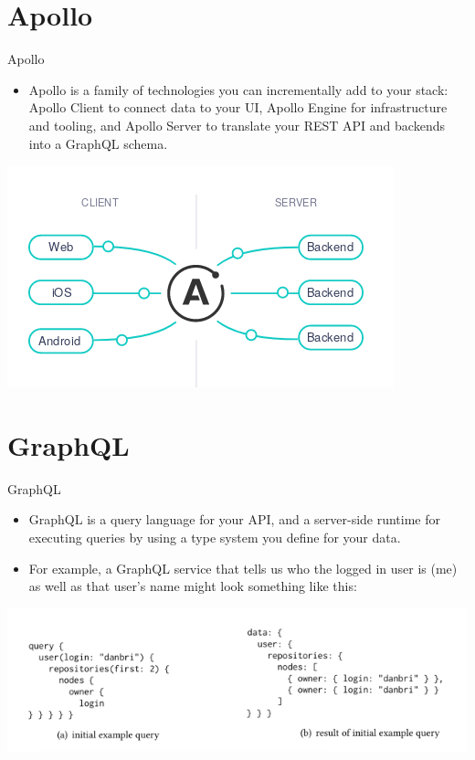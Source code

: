 \documentclass{beamer}
\begin{document}
\section{Apollo}
\begin{frame}{Apollo}{ }
\begin{itemize}
	\item Apollo is a family of technologies you can incrementally add to your stack: Apollo Client to connect data to your UI, Apollo Engine for infrastructure and tooling, and Apollo Server to translate your REST API and backends into a GraphQL schema.
\end{itemize}

\begin{center}
	\includegraphics[width=0.7\linewidth]{img/apollo.png}
\end{center}
\end{frame}

\section{GraphQL}

\begin{frame}{GraphQL}{ }
	\begin{itemize}
		\item GraphQL is a query language for your API, and a server-side runtime for executing queries by using a type system you define for your data.
		\item  For example, a GraphQL service that tells us who the logged in user is (me) as well as that user's name might look something like this:
	\end{itemize}

\begin{center}
	\includegraphics[width=0.7\linewidth]{img/query.jpeg}
\end{center}
\end{frame}
\end{document}
